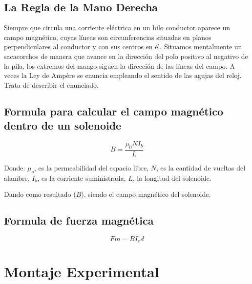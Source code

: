 \documentclass[twocolumn, 12pt]{article}
\begin{document}
\subsection*{La Regla de la Mano Derecha}

Siempre que circula una corriente eléctrica en un hilo
conductor aparece un campo magnético, cuyas líneas son
circunferencias situadas en planos perpendiculares al
conductor y con sus centros en él. Situamos mentalmente un
sacacorchos de manera que avance en la dirección del polo
positivo al negativo de la pila, los extremos del mango
siguen la dirección de las líneas del campo. A veces la Ley
de Ampère se enuncia empleando el sentido de las agujas del
reloj. Trata de describir el enunciado.

\subsection*{Formula para calcular el campo magnético dentro de un solenoide}

\begin{equation}
	B = {\frac{\mu_0 N I_b}{L}} \label{eq:FormulaCampoMagneticoSolenoide}
\end{equation}

\nocite{Garcia2016}

Donde: \hfill \break{} \textit{{\large $\mu_o$}}, es la
permeabilidad del espacio libre, \textit{{\large $N$}}, es
la cantidad de vueltas del alambre, \textit{{\large
			$I_b$}}, es la corriente suministrada, \textit{{\large
			$L$}}, la longitud del solenoide.

Dando como resultado (\textit{{\large $B$}}), siendo el
campo magnético del solenoide.

\subsection*{Formula de fuerza magnética}

\begin{equation}
	Fm = B I_e d \label{eq:FormulaFuerzaMagnetica}
\end{equation}

\section{Montaje Experimental}
\end{document}
